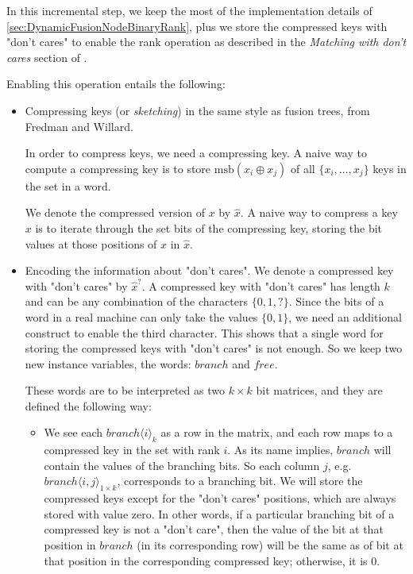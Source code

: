 In this incremental step, we keep the most of the implementation details of \ref{sec:DynamicFusionNodeBinaryRank}, plus we store the compressed keys with "don't cares" to enable the rank operation as described in the \textit{Matching with don't cares} section of \cite{patrascu2014dynamic}.

Enabling this operation entails the following:
\begin{itemize}
    \item
    Compressing keys (or \textit{sketching}) in the same style as fusion trees, from Fredman and Willard.
    
    In order to compress keys, we need a compressing key. A naive way to compute a compressing key is to store $\text{msb}(x_i \oplus x_j)$ of all $\{x_i, \dots, x_j\}$ keys in the set in a word.
    
    We denote the compressed version of $x$ by $\hat x $. A naive way to compress a key $x$ is to iterate through the set bits of the compressing key, storing the bit values at those positions of $x$ in $\hat x$.
    
    \item
    Encoding the information about "don't cares". We denote a compressed key with "don't cares" by $\hat x^?$. A compressed key with "don't cares" has length $k$ and can be any combination of the characters $\{0, 1, ?\}$. Since the bits of a word in a real machine can only take the values $\{0, 1\}$, we need an additional construct to enable the third character. This shows that a single word for storing the compressed keys with "don't cares" is not enough. So we keep two new instance variables, the words: $branch$ and $free$.
    
    These words are to be interpreted as two $k \times k$ bit matrices, and they are defined the following way:
    \begin{itemize}
        \item
        We see each $branch\langle i \rangle_k$ as a row in the matrix, and each row maps to a compressed key in the set with rank $i$.
        As its name implies, $branch$ will contain the values of the branching bits. 
        So each column $j$, e.g. $branch\langle i, j\rangle_{1 \times k}$, corresponds to a branching bit.
        We will store the compressed keys except for the "don't cares" positions, which are always stored with value zero.
        In other words, if a particular branching bit of a compressed key is not a "don't care", then the value of the bit at that position in $branch$ (in its corresponding row) will be the same as of bit at that position in the corresponding compressed key; otherwise, it is 0.
        

\end{itemize}
\end{itemize}
